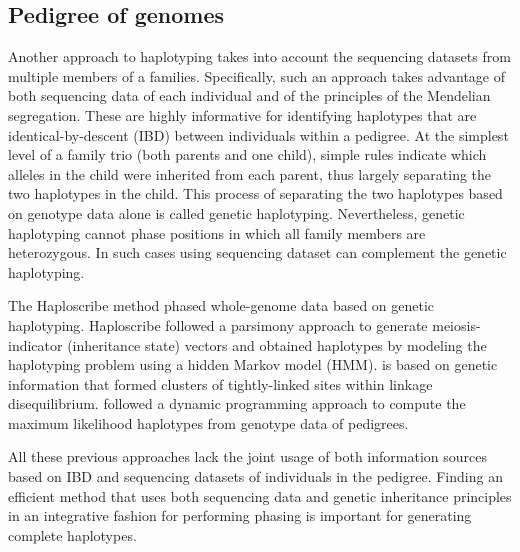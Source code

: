 \subsection{Pedigree of genomes}
Another approach to haplotyping takes into account the sequencing datasets from multiple members of a families.
Specifically, such an approach takes advantage of both sequencing data of each individual and of the principles of the Mendelian segregation. 
These are highly informative for identifying haplotypes that are identical-by-descent (IBD) between individuals within a pedigree.
At the simplest level of a family trio (both parents and one child), simple rules indicate which alleles in the child were inherited from each parent, thus largely separating the two haplotypes in the child.  
This process of separating the two haplotypes based on genotype data alone is called genetic haplotyping.
Nevertheless, genetic haplotyping cannot phase positions in which all family members are heterozygous. 
In such cases using sequencing dataset can complement the genetic haplotyping.

The Haploscribe method \citep{Roach2011} phased whole-genome data based on genetic haplotyping. Haploscribe followed a parsimony approach to generate
meiosis-indicator (inheritance state) vectors and obtained haplotypes by modeling the haplotyping problem using a hidden Markov model (HMM).
\cite{abecasis2002merlin} is based on genetic information that formed clusters of tightly-linked sites within linkage disequilibrium.
\cite{williams2010rapid} followed a dynamic programming approach to compute the maximum likelihood haplotypes from genotype data of pedigrees.

All these previous approaches lack the joint usage of both information sources based on IBD and sequencing datasets of individuals in the pedigree. 
Finding an efficient method that uses both sequencing data and genetic inheritance principles in an integrative fashion for performing phasing is important for generating complete haplotypes.



